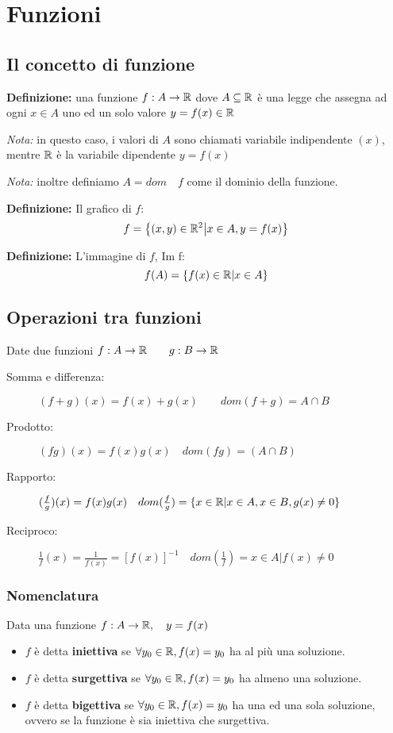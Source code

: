 
\chapter{Funzioni} %

\label{ch:funzioni} %


\section{Il concetto di funzione}
\textbf{Definizione:} una funzione $f: A \rightarrow \mathbb{R}$ dove $A \subseteq \mathbb{R}$ è una legge che assegna ad ogni $x\in A$ uno ed un solo valore $y=f(x) \in \mathbb{R}$

\textit{Nota:} in questo caso, i valori di $A$ sono chiamati variabile indipendente $(x)$, mentre  $\mathbb{R}$ è la variabile dipendente $y=f(x)$

\textit{Nota:} inoltre definiamo $A=dom \quad f$ come il dominio della funzione.

\textbf{Definizione:} Il grafico di $f$:
	\[f=\left\{ (x,y) \in \mathbb{R}^2 \middle| x \in A, y=f(x) \right\}\]

\textbf{Definizione:} L'immagine di $f$, Im f:
	\[f(A)=\left\{ f(x) \in \mathbb{R} \middle| x \in A \right\}\]

\section{Operazioni tra funzioni}
Date due funzioni $f:A\rightarrow \mathbb{R} \qquad g:B\rightarrow \mathbb{R}$
\begin{description}
	\item[Somma e differenza:] $(f+g)(x)=f(x)+g(x) \qquad dom(f+g)=A\cap B$
	\item[Prodotto:] $(fg)(x)=f(x)g(x) \quad dom(fg)=(A\cap B)$
	\item[Rapporto:] $(\frac{f}{g})(x)=f(x)g(x) \quad dom(\frac{f}{g})=\{x\in \mathbb{R} | x\in A, x\in B, g(x) \neq 0\}$
	\item[Reciproco:] $\frac{1}{f}(x)=\frac{1}{f(x)}=[f(x)]^{-1} \quad dom(\frac{1}{f})={x\in A | f(x) \neq 0}$
\end{description}

\subsection{Nomenclatura}
Data una funzione $f: A \rightarrow \mathbb{R} , \quad y=f(x)$
\begin{itemize}
	\item $f$ è detta \textbf{iniettiva} se $\forall y_0 \in \mathbb{R} , f(x)=y_0$ ha al più una soluzione.
	\item $f$ è detta \textbf{surgettiva} se $\forall y_0 \in \mathbb{R} , f(x)=y_0$ ha almeno una soluzione.
	\item $f$ è detta \textbf{bigettiva} se $\forall y_0 \in \mathbb{R} , f(x)=y_0$ ha una ed una sola soluzione, ovvero se la funzione è sia iniettiva che surgettiva.
\end{itemize}

